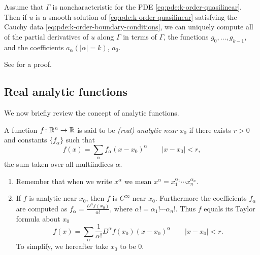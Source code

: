 \begin{theorem}
  Assume that \(\Gamma\) is noncharacteristic for the PDE
  \eqref{eq:pde:k-order-quasilinear}. Then if \(u\) is a smooth solution of
  \eqref{eq:pde:k-order-quasilinear} satisfying the Cauchy data
  \eqref{eq:pde:k-order-boundary-conditions}, we can uniquely compute all
  of the partial derivatives of \(u\) along \(\Gamma\) in terms of
  \(\Gamma\), the functions \(g_0,\dotsc,g_{k-1}\), and the coefficients
  \(a_\alpha(|\alpha|=k)\), \(a_0\).
\end{theorem}

See \cite[\S 4.6.b]{evans} for a proof.

\subsection{Real analytic functions}
We now briefly review the concept of analytic functions.
\begin{definition}
  A function \(f\colon\mathbb{R}^n\to\mathbb{R}\) is said to be \emph{(real) analytic
    near \(x_0\)} if there exists \(r>0\) and constants \(\{f_\alpha\}\)
  such that
  \[
    f(x)=\sum_\alpha f_\alpha(x-x_0)^\alpha\qquad |x-x_0|<r,
  \]
  the sum taken over all multiindices \(\alpha\).
\end{definition}

\begin{remarks}
  \hfill
  \begin{enumerate}[label=(\roman*),noitemsep]
  \item Remember that when we write \(x^\alpha\) we mean
    \(x^\alpha=x_1^{\alpha_1}\dotsm x_n^{\alpha_n}\).
  \item If \(f\) is analytic near \(x_0\), then \(f\) is \(C^\infty\) near
    \(x_0\). Furthermore the coefficients \(f_\alpha\) are computed as
    \(f_\alpha=\frac{D^\alpha f(x_0)}{\alpha!}\), where
    \(\alpha!=\alpha_1!\dotsm \alpha_n!\). Thus \(f\) equals its Taylor
    formula about \(x_0\)
    \[
      f(x)
      =\sum_{\alpha}\frac{1}{\alpha!} D^\alpha f(x_0)(x-x_0)^\alpha\qquad
      |x-x_0|<r.
    \]
    To simplify, we hereafter take \(x_0\) to be \(0\).
  \end{enumerate}
\end{remarks}

